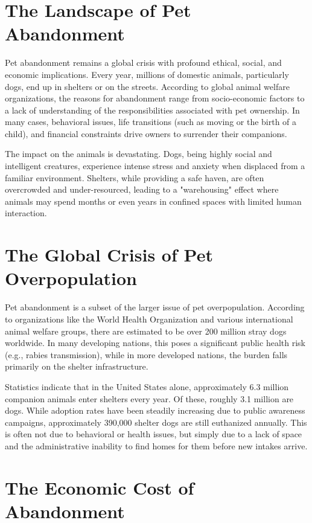 \section{The Landscape of Pet Abandonment}

Pet abandonment remains a global crisis with profound ethical, social, and economic implications. Every year, millions of domestic animals, particularly dogs, end up in shelters or on the streets. According to global animal welfare organizations, the reasons for abandonment range from socio-economic factors to a lack of understanding of the responsibilities associated with pet ownership. In many cases, behavioral issues, life transitions (such as moving or the birth of a child), and financial constraints drive owners to surrender their companions.

The impact on the animals is devastating. Dogs, being highly social and intelligent creatures, experience intense stress and anxiety when displaced from a familiar environment. Shelters, while providing a safe haven, are often overcrowded and under-resourced, leading to a "warehousing" effect where animals may spend months or even years in confined spaces with limited human interaction.

\section{The Global Crisis of Pet Overpopulation}

Pet abandonment is a subset of the larger issue of pet overpopulation. According to organizations like the World Health Organization and various international animal welfare groups, there are estimated to be over 200 million stray dogs worldwide. In many developing nations, this poses a significant public health risk (e.g., rabies transmission), while in more developed nations, the burden falls primarily on the shelter infrastructure.

Statistics indicate that in the United States alone, approximately 6.3 million companion animals enter shelters every year. Of these, roughly 3.1 million are dogs. While adoption rates have been steadily increasing due to public awareness campaigns, approximately 390,000 shelter dogs are still euthanized annually. This is often not due to behavioral or health issues, but simply due to a lack of space and the administrative inability to find homes for them before new intakes arrive.

\section{The Economic Cost of Abandonment}

